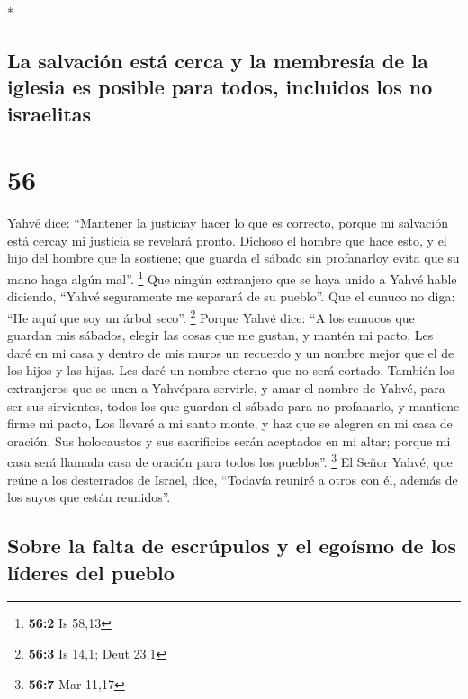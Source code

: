 \begin{paracol}{2}
\begin{otherlanguage}{english}
\end{otherlanguage}

\switchcolumn[0]*

\hypertarget{la-salvaciuxf3n-estuxe1-cerca-y-la-membresuxeda-de-la-iglesia-es-posible-para-todos-incluidos-los-no-israelitas}{%
\subsection{La salvación está cerca y la membresía de la iglesia es
posible para todos, incluidos los no
israelitas}\label{la-salvaciuxf3n-estuxe1-cerca-y-la-membresuxeda-de-la-iglesia-es-posible-para-todos-incluidos-los-no-israelitas}}

\hypertarget{section-110}{%
\section{56}\label{section-110}}

 Yahvé dice: ``Mantener la justiciay hacer lo que es
correcto, porque mi salvación está cercay mi justicia se revelará
pronto.  Dichoso el hombre que hace esto, y el hijo del
hombre que la sostiene; que guarda el sábado sin profanarloy evita que
su mano haga algún mal''. \footnote{\textbf{56:2} Is 58,13}
 Que ningún extranjero que se haya unido a Yahvé hable
diciendo, ``Yahvé seguramente me separará de su pueblo''. Que el eunuco
no diga: ``He aquí que soy un árbol seco''. \footnote{\textbf{56:3} Is
  14,1; Deut 23,1}  Porque Yahvé dice: ``A los eunucos que
guardan mis sábados, elegir las cosas que me gustan, y mantén mi pacto,
 Les daré en mi casa y dentro de mis muros un recuerdo y
un nombre mejor que el de los hijos y las hijas. Les daré un nombre
eterno que no será cortado.  También los extranjeros que
se unen a Yahvépara servirle, y amar el nombre de Yahvé, para ser sus
sirvientes, todos los que guardan el sábado para no profanarlo, y
mantiene firme mi pacto,  Los llevaré a mi santo monte, y
haz que se alegren en mi casa de oración. Sus holocaustos y sus
sacrificios serán aceptados en mi altar; porque mi casa será llamada
casa de oración para todos los pueblos''. \footnote{\textbf{56:7} Mar
  11,17}  El Señor Yahvé, que reúne a los desterrados de
Israel, dice, ``Todavía reuniré a otros con él, además de los suyos que
están reunidos''.

\hypertarget{sobre-la-falta-de-escruxfapulos-y-el-egouxedsmo-de-los-luxedderes-del-pueblo}{%
\subsection{Sobre la falta de escrúpulos y el egoísmo de los líderes del
pueblo}\label{sobre-la-falta-de-escruxfapulos-y-el-egouxedsmo-de-los-luxedderes-del-pueblo}}


\end{paracol}
